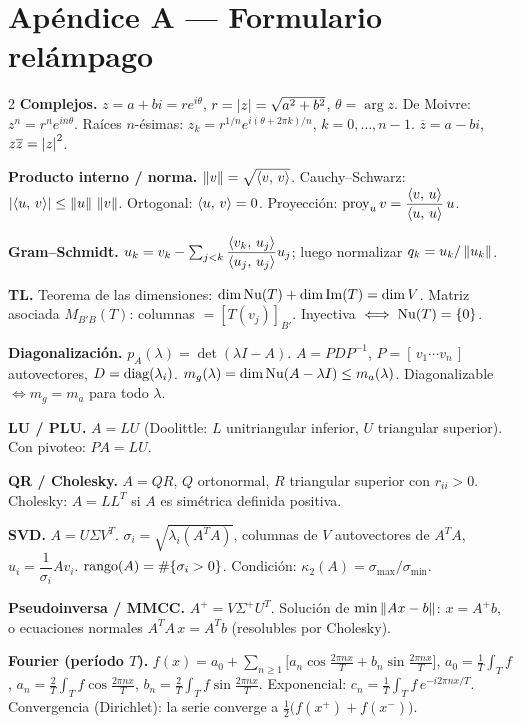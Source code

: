 \newpage
\section{Apéndice A — Formulario relámpago}

\begin{multicols}{2}\small
\textbf{Complejos.} $z=a+bi=r e^{i\theta}$, $r=\left\lvert z \right\rvert=\sqrt{a^2+b^2}$, $\theta=\arg z$.
De Moivre: $z^n=r^n e^{in\theta}$. Raíces $n$-ésimas: $z_k=r^{1/n}e^{i(\theta+2\pi k)/n}$, $k=0,\dots,n-1$.
$\overline{z}=a-bi$, $z\overline z=\left\lvert z \right\rvert^2$.

\smallskip
\textbf{Producto interno / norma.} $\left\lVert v \right\rVert=\sqrt{\left\langle v,\, v \right\rangle}$. Cauchy--Schwarz: $\left\lvert \left\langle u,\, v \right\rangle \right\rvert\le\left\lVert u \right\rVert\,\left\lVert v \right\rVert$.
Ortogonal: $\left\langle u,\, v \right\rangle=0$. Proyección: $\operatorname{proy}_u v=\dfrac{\left\langle v,\, u \right\rangle}{\left\langle u,\, u \right\rangle}\,u$.

\smallskip
\textbf{Gram--Schmidt.} $u_k=v_k-\sum_{j<k}\dfrac{\left\langle v_k,\, u_j \right\rangle}{\left\langle u_j,\, u_j \right\rangle}u_j$; luego normalizar $q_k=u_k/\left\lVert u_k \right\rVert$.

\smallskip
\textbf{TL.} Teorema de las dimensiones: $\dim\operatorname{Nu}(T)+\dim\operatorname{Im}(T)=\dim V$.
Matriz asociada $M_{B'B}(T)$: columnas $=[T(v_j)]_{B'}$. Inyectiva $\iff\operatorname{Nu}(T)=\{0\}$.

\smallskip
\textbf{Diagonalización.} $p_A(\lambda)=\det(\lambda I-A)$. $A=PDP^{-1}$, $P=[\,v_1\cdots v_n\,]$ autovectores, $D=\operatorname{diag}(\lambda_i)$.
$m_g(\lambda)=\dim\operatorname{Nu}(A-\lambda I)\le m_a(\lambda)$. Diagonalizable $\iff m_g=m_a$ para todo $\lambda$.

\smallskip
\textbf{LU / PLU.} $A=LU$ (Doolittle: $L$ unitriangular inferior, $U$ triangular superior). Con pivoteo: $PA=LU$.

\smallskip
\textbf{QR / Cholesky.} $A=QR$, $Q$ ortonormal, $R$ triangular superior con $r_{ii}>0$.
Cholesky: $A=LL^{T}$ si $A$ es simétrica definida positiva.

\smallskip
\textbf{SVD.} $A=U\Sigma V^{T}$. $\sigma_i=\sqrt{\lambda_i(A^{T}A)}$, columnas de $V$ autovectores de $A^{T}A$, $u_i=\dfrac{1}{\sigma_i}Av_i$.
$\operatorname{rango}(A)=\#\{\sigma_i>0\}$. Condición: $\kappa_2(A)=\sigma_{\max}/\sigma_{\min}$.

\smallskip
\textbf{Pseudoinversa / MMCC.} $A^{+}=V\Sigma^{+}U^{T}$. Solución de $\min\left\lVert Ax-b \right\rVert$: $x=A^{+}b$, o ecuaciones normales $A^{T}A\,x=A^{T}b$ (resolubles por Cholesky).

\smallskip
\textbf{Fourier (período $T$).} $f(x)=a_0+\sum_{n\ge1}\!\big[a_n\cos\tfrac{2\pi n x}{T}+b_n\sin\tfrac{2\pi n x}{T}\big]$,
$a_0=\tfrac1T\!\int_T f$, $a_n=\tfrac2T\!\int_T f\cos\tfrac{2\pi n x}{T}$, $b_n=\tfrac2T\!\int_T f\sin\tfrac{2\pi n x}{T}$.
Exponencial: $c_n=\tfrac1T\!\int_T f\,e^{-i2\pi n x/T}$.
Convergencia (Dirichlet): la serie converge a $\tfrac12\big(f(x^+)+f(x^-)\big)$.


\end{multicols}
